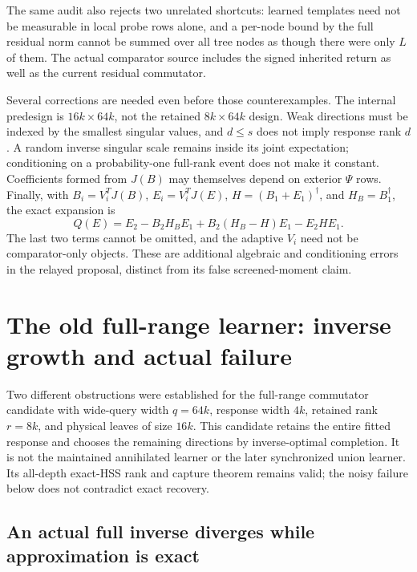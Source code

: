\documentclass[11pt,oneside,openany,a4paper]{book}
\numberwithin{equation}{chapter}
\theoremstyle{definition}
\theoremstyle{remark}
\begin{document}
The same audit also rejects two unrelated shortcuts: learned templates
need not be measurable in local probe rows alone, and a per-node bound
by the full residual norm cannot be summed over all tree nodes as though
there were only $L$ of them.  The actual comparator source includes the
signed inherited return as well as the current residual commutator.

Several corrections are needed even before those counterexamples.
The internal predesign is $16k\times64k$, not the retained
$8k\times64k$ design.  Weak directions must be indexed by the smallest
singular values, and $d\le s$ does not imply response rank $d$.
A random inverse singular scale remains inside its joint expectation;
conditioning on a probability-one full-rank event does not make it
constant.  Coefficients formed from $J(B)$ may themselves depend on
exterior $\Psi$ rows.  Finally, with
$B_i=V_i^TJ(B)$, $E_i=V_i^TJ(E)$,
$H=(B_1+E_1)^\dagger$, and $H_B=B_1^\dagger$, the exact expansion is
\[
 Q(E)=E_2-B_2H_BE_1+B_2(H_B-H)E_1-E_2HE_1.
\]
The last two terms cannot be omitted, and the adaptive $V_i$ need not
be comparator-only objects.  These are additional algebraic and
conditioning errors in the relayed proposal, distinct from its false
screened-moment claim.

\section{The old full-range learner: inverse growth and actual failure}
\label{upd:sec:later-fullrange}

Two different obstructions were established for the full-range
commutator candidate with wide-query width $q=64k$, response width
$4k$, retained rank $r=8k$, and physical leaves of size $16k$.  This
candidate retains the entire fitted response and chooses the remaining
directions by inverse-optimal completion.  It is not the maintained
annihilated learner or the later synchronized union learner.  Its
all-depth exact-HSS rank and capture theorem remains valid; the noisy
failure below does not contradict exact recovery.

\subsection{An actual full inverse diverges while approximation is exact}
\end{document}
